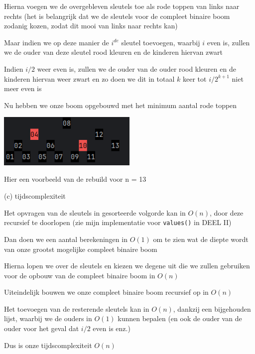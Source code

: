 \documentclass{article}
\def\code#1{\texttt{#1}}
\begin{document}
Hierna voegen we de overgebleven sleutels toe als rode toppen van links naar rechts (het is belangrijk dat we de sleutels voor de compleet binaire boom zodanig kozen, zodat dit mooi van links naar rechts kan)

Maar indien we op deze manier de $i^{de}$ sleutel toevoegen, waarbij $i$ even is, zullen we de ouder van deze sleutel rood kleuren en de kinderen hiervan zwart

Indien $i / 2$ weer even is, zullen we de ouder van de ouder rood kleuren en de kinderen hiervan weer zwart en zo doen we dit in totaal $k$ keer tot $i / 2^{k+1}$ niet meer even is

Nu hebben we onze boom opgebouwd met het minimum aantal rode toppen

\newpage

\includegraphics[width=0.5\textwidth]{redblack_rebuild_13.png}

\vspace{0.2cm}

Hier een voorbeeld van de rebuild voor n = 13

\vspace{0.5cm}

\Large (c) tijdscomplexiteit
\vspace{0.3cm}

\large
Het opvragen van de sleutels in gesorteerde volgorde kan in $O(n)$, door deze recursief te doorlopen (zie mijn implementatie voor \code{values()} in DEEL II)

Dan doen we een aantal berekeningen in $O(1)$ om te zien wat de diepte wordt van onze grootst mogelijke compleet binaire boom

Hierna lopen we over de sleutels en kiezen we degene uit die we zullen gebruiken voor de opbouw van de compleet binaire boom in $O(n)$

Uiteindelijk bouwen we onze compleet binaire boom recursief op in $O(n)$

Het toevoegen van de resterende sleutels kan in $O(n)$, dankzij een bijgehouden lijst, waarbij we de ouders in $O(1)$ kunnen bepalen (en ook de ouder van de ouder voor het geval dat $i / 2$ even is enz.)

Dus is onze tijdscomplexiteit $O(n)$
\end{document}
